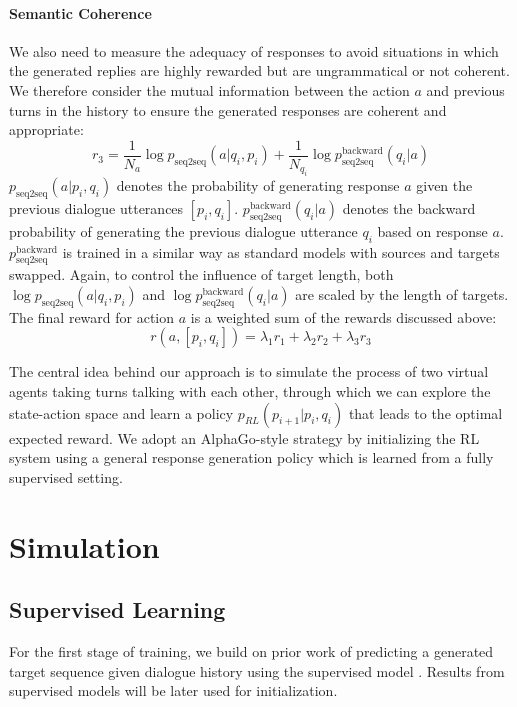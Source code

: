 \paragraph{Semantic Coherence}
We also need to measure the adequacy of responses to avoid situations in which the generated replies are highly rewarded but are ungrammatical or not coherent.
 We therefore  consider the mutual information between the action $a$ and previous turns in the history to ensure the generated responses are coherent and appropriate: 
\begin{equation}
r_3=\frac{1}{N_a}\log p_{\text{seq2seq}}(a|q_i,p_i)+\frac{1}{N_{q_i}}\log p_{\text{seq2seq}}^{\text{backward}}(q_i|a)
\label{eq4}
\end{equation}
$p_{\text{seq2seq}}(a|p_i,q_i)$  denotes the probability of generating response $a$ given the previous dialogue utterances $[p_i,q_i]$. $p_{\text{seq2seq}}^{\text{backward}}(q_i|a)$ denotes the backward probability of generating the previous dialogue utterance $q_i$ based on response $a$. $p_{\text{seq2seq}}^{\text{backward}}$ is trained in a similar way as standard \sts models with sources and targets swapped. 
Again, to control the influence of target length, both $\log p_{\text{seq2seq}}(a|q_i,p_i)$ and  $\log p_{\text{seq2seq}}^{\text{backward}}(q_i|a)$ are scaled by the length of targets.
The final reward for  action $a$ is a weighted sum of the rewards discussed above:
\begin{equation}
r(a,[p_i,q_i])=\lambda_1 r_1+\lambda_2 r_2+\lambda_3 r_3
\label{reward}
\end{equation}

The central idea behind our approach is to simulate the process of two virtual agents taking turns talking with each other, through which we can explore the state-action space and learn a policy
$p_{RL}(p_{i+1}|p_{i}, q_i)$ that leads to the optimal expected reward.
We adopt an AlphaGo-style strategy \cite{silver2016mastering} by initializing the RL system using a general response generation policy which is learned from a fully supervised setting. 
\section{Simulation}
\subsection{Supervised Learning}
 For the first stage of training, we build on prior work of predicting a generated target sequence given dialogue history using the supervised \sts model \cite{vinyals2015neural}.
 Results from supervised models will be later used for initialization. 
 
